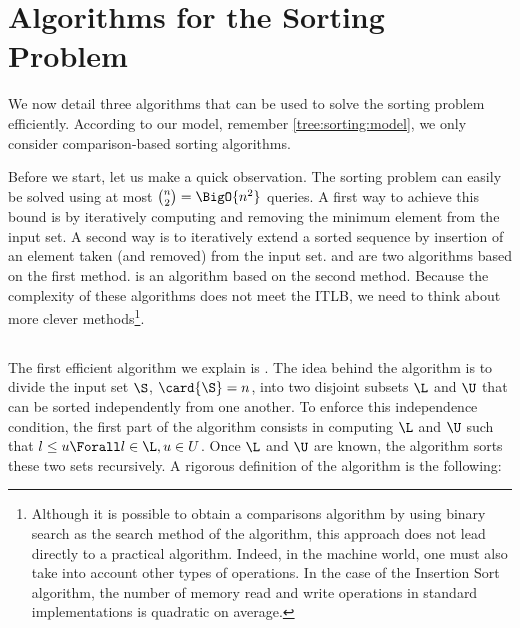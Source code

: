 \section{Algorithms for the Sorting Problem}
\label{tree:sorting:alg}

We now detail three algorithms that can be used to solve the sorting
problem efficiently. According to our model, remember \ref{tree:sorting:model},
we only consider comparison-based sorting algorithms.


Before we start, let us make a quick observation. The sorting problem can
easily be solved using at most \(\binom{n}{2} = \BigO{n^2}\) queries. A first
way to achieve this bound is by iteratively computing and removing the minimum
element from the input set. A second way is to iteratively
extend a sorted sequence by insertion of an element taken (and removed) from
the input set. \selectionsort and \bubblesort are two algorithms based on the
first method. \insertionsort is an algorithm based on the second method.
Because the complexity of these algorithms does not meet the ITLB, we need
to think about more clever methods\footnote{Although it is possible to obtain
a  comparisons algorithm by using binary search as the search
method of the \insertionsort algorithm, this approach does not lead directly to
a practical algorithm. Indeed, in the machine world, one must also take into
account other types of operations. In the case of the Insertion Sort algorithm,
the number of memory read and write operations in standard implementations is
quadratic on average.}.

\subsection*{\quicksort}

The first efficient algorithm we explain is \quicksort \cite{hoare:1962}.
The idea behind the \quicksort algorithm is to divide the input set \(\S\),
\(\card{\S} = n\), into two disjoint subsets \(\L\) and \(\U\) that can be
sorted independently from one another. To enforce this independence condition,
the first part of the algorithm consists in computing \(\L\) and \(\U\) such
that \(l \le u \Forall l \in \L, u \in U\). Once \(\L\) and \(\U\) are known,
the algorithm sorts these two sets recursively. A rigorous definition of the
algorithm is the following:

